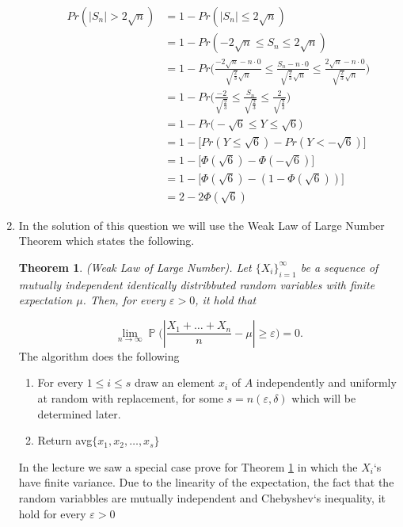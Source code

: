 \documentclass[a4paper, 11pt, oneside]{article}
\newtheorem{theorem}{Theorem}[section]
\newcommand\abs[1]{\left|#1\right|}
\DeclareMathOperator{\PX}{\mathbb{P}}
\begin{document}
\begin{enumerate}
\begin{enumerate}
\begin{align*}
Pr(\abs{S_n}>2\sqrt{n}) &=
 1 - Pr(\abs{S_n} \leq 2\sqrt{n}) \\&=
 1 - Pr(-2\sqrt{n} \leq S_n \leq 2\sqrt{n}) \\&=
 1 - Pr\Bigg(\frac{-2\sqrt{n} - n \cdot 0}{\sqrt{\frac{2}{3}}\sqrt{n}} \leq \frac{S_n - n \cdot 0}{\sqrt{\frac{2}{3}}\sqrt{n}} \leq \frac{2\sqrt{n} - n \cdot 0}{\sqrt{\frac{2}{3}}\sqrt{n}}\Bigg) \\&=
 1 - Pr\Bigg(\frac{-2}{\sqrt{\frac{2}{3}}} \leq \frac{S_n}{\sqrt{\frac{2}{3}}} \leq \frac{2}{\sqrt{\frac{2}{3}}}\Bigg)\\&=
 1 - Pr\Bigg(-\sqrt{6} \leq Y \leq \sqrt{6}\Bigg)\\&=
 1 - \Big[Pr(Y \leq \sqrt{6}) - Pr(Y < -\sqrt{6})\Big] \\&=
 1 - \Big[\Phi(\sqrt{6}) -\Phi(-\sqrt{6})\Big] \\&=
 1 - \Big[\Phi(\sqrt{6}) - (1 - \Phi(\sqrt{6}))\Big] \\&=
 2 - 2\Phi(\sqrt{6})
 \end{align*}
\end{enumerate}
 \item  In the solution of this question we will use the Weak Law of Large Number Theorem which states the following.
\begin{theorem} 
\label{weak}
(Weak Law of Large Number). Let $\{X_i\}^\infty_{i=1}$ be a sequence of mutually independent identically distribbuted random variables with finite
expectation $\mu$. Then, for every $\varepsilon > 0$, it hold that
\end{theorem} 
\begin{equation*}
\lim\limits_{n \to \infty} \PX \Bigg(\abs{\frac{X_1+\ldots+X_n}{n} - \mu}\geq \varepsilon\Bigg) = 0.
 \end{equation*}
 The algorithm does the following
 \begin{enumerate}
\item For every $1 \leq i \leq s$ draw an element $x_i$ of $A$ independently and uniformly at random with replacement, for some $s = n(\varepsilon,\delta)$ which will be determined later. 
\item Return avg$\{x_1,x_2,\ldots,x_s\}$
 \end{enumerate}
In the lecture we saw a special case prove for Theorem \ref{weak} in which the $X_i$`s have finite variance.
Due to the linearity of the expectation, the fact that the random variabbles are mutually independent and Chebyshev`s inequality, it hold for every $\varepsilon > 0$ 
 \begin{align*}

\end{align*}
\end{enumerate}
\end{document}
